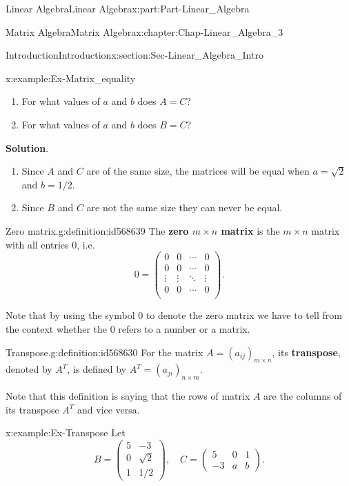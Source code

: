 \documentclass[oneside,10pt,]{book}
\newcommand{\blocktitlefont}{\relax}
\newcommand{\terminology}[1]{\textbf{#1}}
\numberwithin{equation}{section}
\newcommand{\amp}{&}
\begin{document}
\begin{partptx}{Linear Algebra}{}{Linear Algebra}{}{}{x:part:Part-Linear_Algebra}
\begin{chapterptx}{Matrix Algebra}{}{Matrix Algebra}{}{}{x:chapter:Chap-Linear_Algebra_3}
\begin{sectionptx}{Introduction}{}{Introduction}{}{}{x:section:Sec-Linear_Algebra_Intro}
\begin{example}{}{x:example:Ex-Matrix_equality}
\begin{enumerate}[label=\alph*]
\item{}For what values of \(a\) and \(b\) does \(A=C\)?%
\item{}For what values of \(a\) and \(b\) does \(B=C\)?%
\end{enumerate}
%
\par\smallskip%
\noindent\textbf{\blocktitlefont Solution}.\hypertarget{g:solution:id568570}{}\quad{}%
\begin{enumerate}[label=\alph*]
\item{}Since \(A\) and \(C\) are of the same size, the matrices will be equal when \(a=\sqrt{2}\) and \(b=1/2\).%
\item{}Since \(B\) and \(C\) are not the same size they can never be equal.%
\end{enumerate}
\end{example}
\begin{definition}{Zero matrix.}{g:definition:id568639}%
The \terminology{zero \(m \times n\) matrix} is the \(m \times n\)  matrix with all entries \(0\), i.e.%
\begin{equation*}
0 = \begin{pmatrix}
0 \amp 0 \amp  \cdots \amp 0\\
0 \amp 0\amp \cdots \amp 0\\
\vdots \amp \vdots \amp \ddots \amp \vdots\\
0\amp 0\amp \cdots \amp 0\\
\end{pmatrix}.
\end{equation*}
\end{definition}
Note that by using the symbol \(0\) to denote the zero matrix we have to tell from the context whether the \(0\) refers to a number or a matrix.%
\begin{definition}{Transpose.}{g:definition:id568630}%
For the matrix \(A=(a_{ij})_{m \times n}\), its \terminology{transpose}, denoted by \(A^T\), is defined by \(A^T = \left(a_{ji}\right)_{n \times m}\).\end{definition}
Note that this definition is saying that the rows of matrix \(A\) are the columns of its transpose \(A^T\) and vice versa.%
\begin{example}{}{x:example:Ex-Transpose}%
Let%
\begin{equation*}
B = \begin{pmatrix}5 \amp -3 \\ 0 \amp \sqrt{2} \\ 1 \amp 1/2\end{pmatrix}, \quad C = \begin{pmatrix} 5 \amp 0 \amp 1\\ -3 \amp a \amp b\end{pmatrix}.

\end{equation*}
\end{example}
\end{sectionptx}
\end{chapterptx}
\end{partptx}
\end{document}
